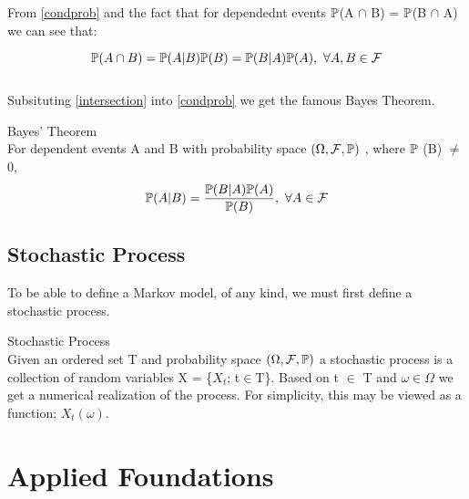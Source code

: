 From \ref{condprob} and the fact that for dependednt events $\mathbb{P}$(A $\cap$ B) = $\mathbb{P}$(B $\cap$ A) we can see that:

\begin{equation}
\label{intersection}
    \mathbb{P} (A \cap B) = \mathbb{P} (A|B) \mathbb{P} (B) = \mathbb{P} (B|A) \mathbb{P} (A), \  \forall A,B \in \mathcal{F}
\end{equation}
\\

Subsituting \ref{intersection} into \ref{condprob} we get the famous Bayes Theorem. 

\begin{theorem}
\label{bayes}
    Bayes’ Theorem \\
    For dependent events A and B with probability space $(\Omega ,\mathcal{F} , \mathbb{P})$ , where $\mathbb{P}$         (B) $\ne$ 0,
    \begin{equation}
        \mathbb{P} (A|B) = \dfrac{\mathbb{P} (B|A) \mathbb{P} (A)}{\mathbb{P} (B)}, \  \forall A \in \mathcal{F}
    \end{equation}
\end{theorem}



\subsection{Stochastic Process}
To be able to define a Markov model, of any kind, we must first define a stochastic process. 
\begin{definition}
\label{stochasticp} 
    Stochastic Process \\
    Given an ordered set T and probability space $(\Omega ,\mathcal{F} , \mathbb{P})$ a stochastic process is        a collection of random variables X = \{$X_t$; t$\in$T\}. Based on t $\in $ T and $\omega \in \Omega$        we get a numerical realization of the process.  For simplicity, this may be viewed as a function;           $X_t( \omega)$.

\end{definition}




\section{Applied Foundations}